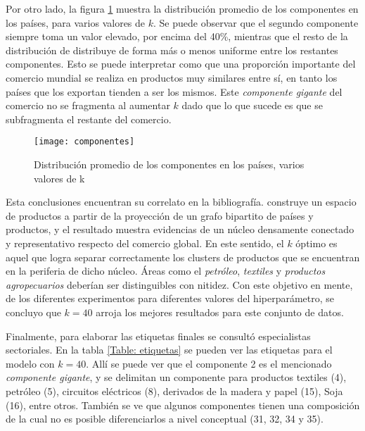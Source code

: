 \documentclass[class=article, crop=false]{standalone}
\begin{document}
Por otro lado, la figura \ref{fig:componentes} muestra la distribución promedio de los componentes en los países, para varios valores de $k$. Se puede observar que el segundo componente siempre toma un valor elevado, por encima del 40\%, mientras que el resto de la distribución de distribuye de forma más o menos uniforme entre los restantes componentes. Esto se puede interpretar como que una proporción importante del comercio mundial se realiza en productos muy similares entre sí, en tanto los países que los exportan tienden a ser los mismos. Este \textit{componente gigante} del comercio no se fragmenta al aumentar $k$ dado que lo que sucede es que se subfragmenta el restante del comercio. 

\begin{figure}[h]
	\centering	
	\texttt{[image: componentes]}
	\caption{Distribución promedio de los componentes en los países, varios valores de k}
	\label{fig:componentes}
\end{figure}

Esta conclusiones encuentran su correlato en la bibliografía. \cite{Hidalgo2007} construye un espacio de productos a partir de la proyección de un grafo bipartito de países y productos, y el resultado muestra evidencias de un núcleo densamente conectado y representativo respecto del comercio global. En este sentido, el $k$ óptimo es aquel que logra separar correctamente los clusters de productos que se encuentran en la periferia de dicho núcleo. Áreas como el \textit{petróleo}, \textit{textiles} y \textit{productos agropecuarios} deberían ser distinguibles con nitidez. Con este objetivo en mente, de los diferentes experimentos para diferentes valores del hiperparámetro, se concluyo que $k=40$ arroja los mejores resultados para este conjunto de datos.

Finalmente, para elaborar las etiquetas finales se consultó especialistas sectoriales. En la tabla \ref{Table: etiquetas} se pueden ver las etiquetas para el modelo con $k=40$. Allí se puede ver que el componente 2 es el mencionado \textit{componente gigante}, y se delimitan un componente para productos textiles (4), petróleo (5), circuitos eléctricos (8), derivados de la madera y papel (15), Soja (16), entre otros. También se ve que algunos componentes tienen una composición de la cual no es posible diferenciarlos a nivel conceptual (31, 32, 34 y 35).
\end{document}
